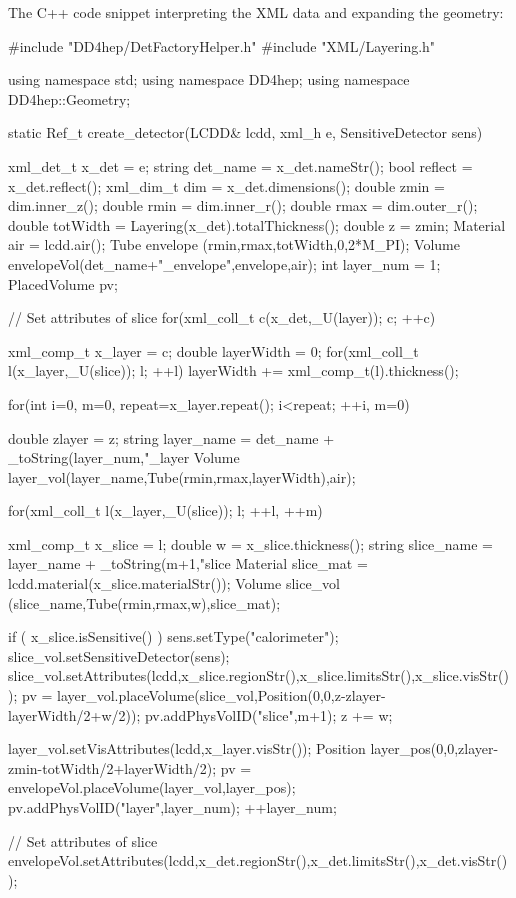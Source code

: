\documentclass[10pt,a4paper]{article}
\begin{document}
\vspace{0.1cm}
\noindent
The C++ code snippet interpreting the XML data and expanding the geometry:
\vspace{0.1cm}
\begin{code}
#include "DD4hep/DetFactoryHelper.h"
#include "XML/Layering.h"

using namespace std;
using namespace DD4hep;
using namespace DD4hep::Geometry;

static Ref_t create_detector(LCDD& lcdd, xml_h e, SensitiveDetector sens)  {
  xml_det_t  x_det     = e;
  string     det_name  = x_det.nameStr();
  bool       reflect   = x_det.reflect();
  xml_dim_t  dim       = x_det.dimensions();
  double     zmin      = dim.inner_z();
  double     rmin      = dim.inner_r();
  double     rmax      = dim.outer_r();
  double     totWidth  = Layering(x_det).totalThickness();
  double     z         = zmin;
  Material   air       = lcdd.air();
  Tube       envelope   (rmin,rmax,totWidth,0,2*M_PI);
  Volume     envelopeVol(det_name+"_envelope",envelope,air);
  int        layer_num = 1;
  PlacedVolume pv;

  // Set attributes of slice
  for(xml_coll_t c(x_det,_U(layer)); c; ++c)  {
    xml_comp_t x_layer = c;
    double layerWidth = 0;
    for(xml_coll_t l(x_layer,_U(slice)); l; ++l)
      layerWidth += xml_comp_t(l).thickness();

    for(int i=0, m=0, repeat=x_layer.repeat(); i<repeat; ++i, m=0)  {
      double     zlayer = z;
      string     layer_name = det_name + _toString(layer_num,"_layer%
      Volume     layer_vol(layer_name,Tube(rmin,rmax,layerWidth),air);
        
      for(xml_coll_t l(x_layer,_U(slice)); l; ++l, ++m)  {
        xml_comp_t x_slice = l;
        double     w = x_slice.thickness();
        string     slice_name = layer_name + _toString(m+1,"slice%
        Material   slice_mat  = lcdd.material(x_slice.materialStr());
        Volume     slice_vol (slice_name,Tube(rmin,rmax,w),slice_mat);
          
        if ( x_slice.isSensitive() )  {
          sens.setType("calorimeter");
          slice_vol.setSensitiveDetector(sens);
        }
        slice_vol.setAttributes(lcdd,x_slice.regionStr(),x_slice.limitsStr(),x_slice.visStr());
        pv = layer_vol.placeVolume(slice_vol,Position(0,0,z-zlayer-layerWidth/2+w/2));
        pv.addPhysVolID("slice",m+1);
        z += w;
      }
      layer_vol.setVisAttributes(lcdd,x_layer.visStr());
      Position layer_pos(0,0,zlayer-zmin-totWidth/2+layerWidth/2);
      pv = envelopeVol.placeVolume(layer_vol,layer_pos);
      pv.addPhysVolID("layer",layer_num);
      ++layer_num;
    }
  }
  // Set attributes of slice
  envelopeVol.setAttributes(lcdd,x_det.regionStr(),x_det.limitsStr(),x_det.visStr());

}
\end{code}
\end{document}
